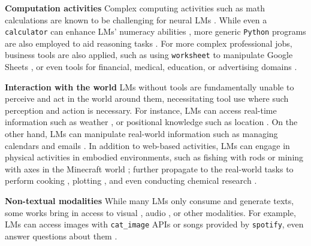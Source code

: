 \noindent \textbf{ Computation activities} \quad
Complex computing activities such as math calculations are known to be challenging for neural LMs \citep{schick2023toolformer}. While even a \texttt{calculator} can enhance LMs' numeracy abilities \citep{parisi2022talm,hao2023toolkengpt}, more generic \texttt{Python} programs are also employed to aid reasoning tasks \citep{gao2023pal,chen2023program,wang2023mint}.
For more complex professional jobs, business tools are also applied, such as using \texttt{worksheet} to manipulate Google Sheets \citep{xu2023tool}, or even tools for financial, medical, education, or advertising domains \citep{tang2023toolalpaca,huang2024metatool}.


\noindent \textbf{ Interaction with the world} \quad
LMs without tools are fundamentally unable to perceive and act in the world around them, necessitating tool use where such perception and action is necessary. For instance, LMs can access real-time information such as weather \citep{xu2023tool,tang2023toolalpaca}, or positional knowledge such as location \citep{qin2023toolllm}. On the other hand, LMs can manipulate real-world information such as managing calendars \citep{schick2023toolformer} and emails \citep{qin2023toolllm}.
In addition to web-based activities, LMs can engage in physical activities in embodied environments, such as fishing with rods or mining with axes in the Minecraft world \citep{wang2023voyager}; further propagate to the real-world tasks to perform cooking \citep{singh2022progprompt,shridhar2020alfred}, plotting \citep{liang2023code}, and even conducting chemical research \citep{boiko2023autonomous}.


\noindent \textbf{ Non-textual modalities} \quad
While many LMs only consume and generate texts, some works bring in access to visual \citep{gupta2022visual,suris2023vipergpt}, audio \citep{yang2023mmreact,gao2023assistgpt}, or other modalities. For example, LMs can access images with \texttt{cat\_image} APIs \citep{xu2023tool,tang2023toolalpaca} or songs \citep{huang2024metatool} provided by \texttt{spotify}, even answer questions about them \citep{gupta2022visual,gao2023assistgpt}.


